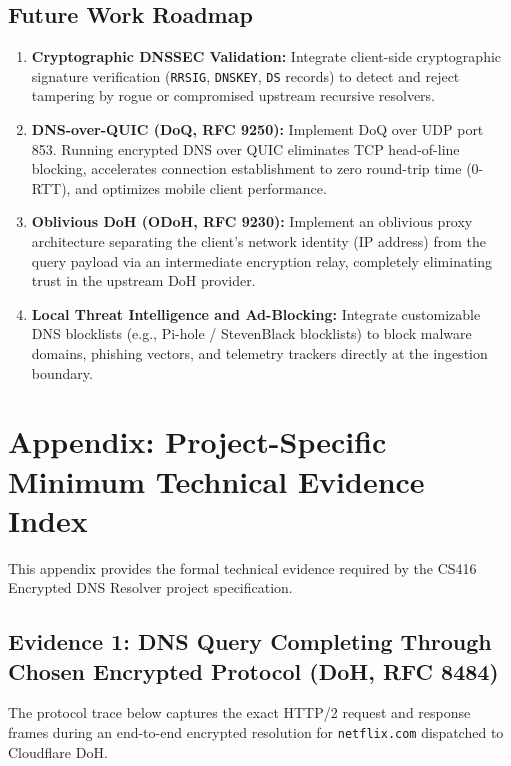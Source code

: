 \documentclass[10pt,a4paper]{article}
\begin{document}
\subsection{Future Work Roadmap}
\begin{enumerate}\itemsep 2pt
    \item \textbf{Cryptographic DNSSEC Validation:} Integrate client-side cryptographic signature verification (\texttt{RRSIG}, \texttt{DNSKEY}, \texttt{DS} records) to detect and reject tampering by rogue or compromised upstream recursive resolvers.
    \item \textbf{DNS-over-QUIC (DoQ, RFC 9250):} Implement DoQ over UDP port 853. Running encrypted DNS over QUIC eliminates TCP head-of-line blocking, accelerates connection establishment to zero round-trip time (0-RTT), and optimizes mobile client performance.
    \item \textbf{Oblivious DoH (ODoH, RFC 9230):} Implement an oblivious proxy architecture separating the client's network identity (IP address) from the query payload via an intermediate encryption relay, completely eliminating trust in the upstream DoH provider.
    \item \textbf{Local Threat Intelligence and Ad-Blocking:} Integrate customizable DNS blocklists (e.g., Pi-hole / StevenBlack blocklists) to block malware domains, phishing vectors, and telemetry trackers directly at the ingestion boundary.
\end{enumerate}

\section{Appendix: Project-Specific Minimum Technical Evidence Index}

This appendix provides the formal technical evidence required by the CS416 Encrypted DNS Resolver project specification.

\subsection{Evidence 1: DNS Query Completing Through Chosen Encrypted Protocol (DoH, RFC 8484)}
The protocol trace below captures the exact HTTP/2 request and response frames during an end-to-end encrypted resolution for \texttt{netflix.com} dispatched to Cloudflare DoH.
\end{document}

